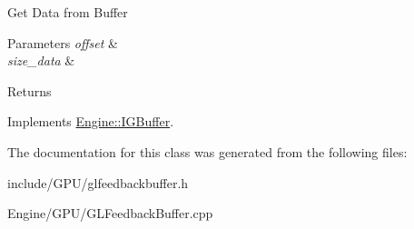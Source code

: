 Get Data from Buffer 
\begin{DoxyParams}{Parameters}
{\em offset} & \\
\hline
{\em size\+\_\+data} & \\
\hline
\end{DoxyParams}
\begin{DoxyReturn}{Returns}

\end{DoxyReturn}


Implements \hyperlink{classEngine_1_1IGBuffer_a8ad52dc670797d72aabf99033d20b220}{Engine\+::\+I\+G\+Buffer}.



The documentation for this class was generated from the following files\+:\begin{DoxyCompactItemize}
\item 
include/\+G\+P\+U/glfeedbackbuffer.\+h\item 
Engine/\+G\+P\+U/G\+L\+Feedback\+Buffer.\+cpp\end{DoxyCompactItemize}
